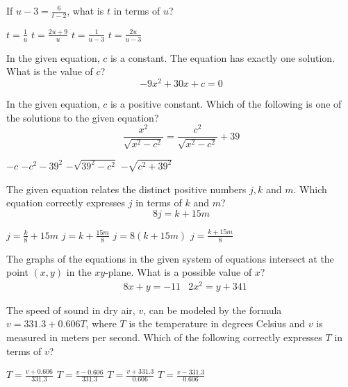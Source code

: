 \question[1]
If $u-3=\frac{6}{t-2}$, what is $t$ in terms of $u$?
\begin{choices}
  \choice $t=\frac{1}{u}$
  \choice $t=\frac{2 u+9}{u}$
  \choice $t=\frac{1}{u-3}$
  \CorrectChoice $t=\frac{2 u}{u-3}$
\end{choices}

\question[1]
In the given equation, $c$ is a constant. The equation has exactly one solution. What is the value of $c$?
\[
-9 x^{2}+30 x+c=0
\]
\begin{choices}
\end{choices}

\question[1]
In the given equation, $c$ is a positive constant. Which of the following is one of the solutions to the given equation?
\[
\frac{x^{2}}{\sqrt{x^{2}-c^{2}}}=\frac{c^{2}}{\sqrt{x^{2}-c^{2}}}+39
\]
\begin{choices}
  \choice $-c$
  \choice $-c^{2}-39^{2}$
  \choice $-\sqrt{39^{2}-c^{2}}$
  \CorrectChoice $-\sqrt{c^{2}+39^{2}}$
\end{choices}

\question[1]
The given equation relates the distinct positive numbers $j, k$ and $m$. Which equation correctly expresses $j$ in terms of $k$ and $m$?
\[
8 j=k+15 m
\]
\begin{choices}
  \choice $j=\frac{k}{8}+15 m$
  \choice $j=k+\frac{15 m}{8}$
  \choice $j=8(k+15 m)$
  \CorrectChoice $j=\frac{k+15 m}{8}$
\end{choices}

\newpage

\question[1]
The graphs of the equations in the given system of equations intersect at the point $(x, y)$ in the $x y$-plane. What is a possible value of $x$?
\[
\begin{aligned}
& 8 x+y=-11 
& 2 x^{2}=y+341
\end{aligned}
\]
\begin{choices}
\end{choices}

\question[1]
The speed of sound in dry air, $v$, can be modeled by the formula $v=331.3+0.606 T$, where $T$ is the temperature in degrees Celsius and $v$ is measured in meters per second. Which of the following correctly expresses $T$ in terms of $v$?
\begin{choices}
  \choice $T=\frac{v+0.606}{331.3}$
  \choice $T=\frac{v-0.606}{331.3}$
  \choice $T=\frac{v+331.3}{0.606}$
  \CorrectChoice $T=\frac{v-331.3}{0.606}$
\end{choices}

